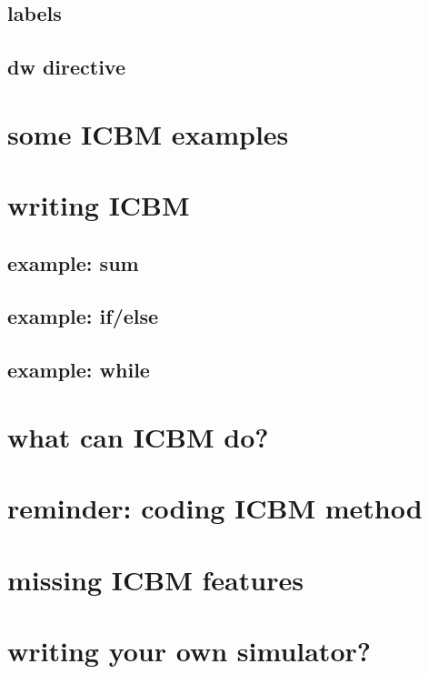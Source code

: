 \subsection{labels}

\subsection{dw directive}

\section{some ICBM examples}

\section{writing ICBM}


\subsection{example: sum}

\subsection{example: if/else}

\subsection{example: while}

\section{what can ICBM do?}


\section{reminder: coding ICBM method}



\section{missing ICBM features}

\section{writing your own simulator?}

